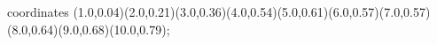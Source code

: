 					coordinates { (1.0,0.04)(2.0,0.21)(3.0,0.36)(4.0,0.54)(5.0,0.61)(6.0,0.57)(7.0,0.57)(8.0,0.64)(9.0,0.68)(10.0,0.79)};